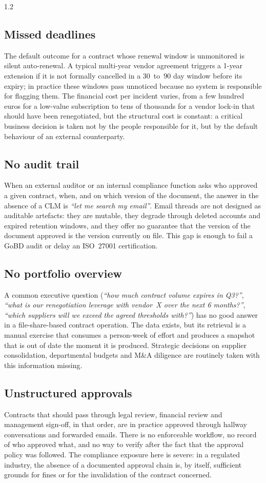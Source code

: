 \begin{spacing}{1.2}
\subsection*{Missed deadlines}
The default outcome for a contract whose renewal window is unmonitored is
silent auto-renewal. A typical multi-year vendor agreement triggers a
1-year extension if it is not formally cancelled in a 30~to~90 day
window before its expiry; in practice these windows pass unnoticed because
no system is responsible for flagging them. The financial cost per
incident varies, from a few hundred euros for a low-value subscription
to tens of thousands for a vendor lock-in that should have been
renegotiated, but the structural cost is constant: a critical business
decision is taken not by the people responsible for it, but by the default
behaviour of an external counterparty.

\subsection*{No audit trail}
When an external auditor or an internal compliance function asks who
approved a given contract, when, and on which version of the document, the
answer in the absence of a CLM is \textit{``let me search my email''}.
Email threads are not designed as auditable artefacts: they are mutable,
they degrade through deleted accounts and expired retention windows,
and they offer no guarantee that the version of the document approved is
the version currently on file. This gap is enough to fail a GoBD audit or
delay an ISO~27001 certification.

\subsection*{No portfolio overview}
A common executive question (\textit{``how much contract volume expires
in Q3?''}, \textit{``what is our renegotiation leverage with vendor~X over
the next 6 months?''}, \textit{``which suppliers will we exceed the
agreed thresholds with?''}) has no good answer in a file-share-based
contract operation. The data exists, but its retrieval is a manual
exercise that consumes a person-week of effort and produces a snapshot
that is out of date the moment it is produced. Strategic decisions on supplier
consolidation, departmental budgets and M\&A diligence are routinely taken
with this information missing.

\subsection*{Unstructured approvals}
Contracts that should pass through legal review, financial review and
management sign-off, in that order, are in practice approved through
hallway conversations and forwarded emails. There is no enforceable
workflow, no record of who approved what, and no way to verify after the
fact that the approval policy was followed. The compliance exposure here
is severe: in a regulated industry, the absence of a documented approval
chain is, by itself, sufficient grounds for fines or for the invalidation
of the contract concerned.


\end{spacing}
